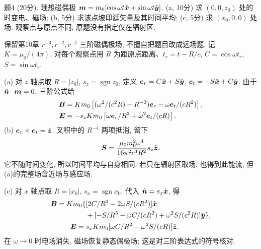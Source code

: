 \begin{exercise}
题4 (20分). 理想磁偶极 $\boldsymbol{m}=m_0[\cos\omega t\hat{\boldsymbol{x}}+\sin\omega t\hat{\boldsymbol{y}}]$. (a, 10分) 求 $(0,0,z_0)$ 处的时变电、磁场; (b, 5分) 求该点坡印廷矢量及其时间平均; (c, 5分) 求 $(x_0,0,0)$ 处场. 观察点与原点不同, 原题没有指定仅在辐射区.
\end{exercise}
\begin{solution}
保留第10章 $r^{-3},r^{-2},r^{-1}$ 三阶磁偶极场, 不擅自把题目改成远场题. 记 $K=\mu_0/(4\pi)$, 对每个观察点用 $R$ 为距原点距离、$t_r=t-R/c$, $C=\cos\omega t_r$, $S=\sin\omega t_r$.

(a) 对 $z$ 轴点取 $R=|z_0|$, $s_z=\operatorname{sgn}z_0$, 定义 $\boldsymbol{e}_r=C\hat{\boldsymbol{x}}+S\hat{\boldsymbol{y}}$, $\boldsymbol{e}_t=-S\hat{\boldsymbol{x}}+C\hat{\boldsymbol{y}}$. 由于 $\hat{\boldsymbol{n}}\cdot\boldsymbol{m}=0$, 三阶公式给
\begin{align*}
\boldsymbol{B}&=Km_0\left[(\omega^2/(c^2R)-R^{-3})\boldsymbol{e}_r
-\omega\boldsymbol{e}_t/(cR^2)\right],\\
\boldsymbol{E}&=-s_zKm_0\left[\omega\boldsymbol{e}_r/R^2+\omega^2\boldsymbol{e}_t/(cR)\right].
\end{align*}
(b) $\boldsymbol{e}_r\times\boldsymbol{e}_t=\hat{\boldsymbol{z}}$. 叉积中的 $R^{-4}$ 两项抵消, 留下
\[
\boldsymbol{S}=\frac{\mu_0m_0^2\omega^4}{16\pi^2c^3R^2}s_z\hat{\boldsymbol{z}}.
\]
它不随时间变化, 所以时间平均与自身相同. 若只在辐射区取场, 也得到此能流, 但(a)的完整场含近场与感应场.

(c) 对 $x$ 轴点取 $R=|x_0|$, $s_x=\operatorname{sgn}x_0$. 代入 $\hat{\boldsymbol{n}}=s_x\hat{\boldsymbol{x}}$, 得
\begin{align*}
\boldsymbol{B}=Km_0\{&[2C/R^3-2\omega S/(cR^2)]\hat{\boldsymbol{x}}\\
&+[-S/R^3-\omega C/(cR^2)+\omega^2S/(c^2R)]\hat{\boldsymbol{y}}\},\\
\boldsymbol{E}={}&s_xKm_0[\omega C/R^2-\omega^2S/(cR)]\hat{\boldsymbol{z}}.
\end{align*}
在 $\omega\to0$ 时电场消失, 磁场恢复静态偶极场; 这是对三阶表达式的符号核对.
\end{solution}

